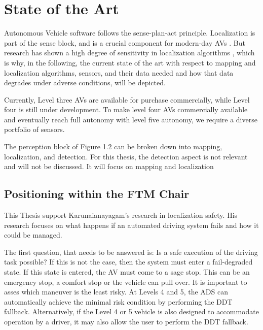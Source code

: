 


\chapter{State of the Art }%
\label{chap:StandderTechnik}%


Autonomous Vehicle software follows the sense-plan-act principle. Localization is part of the sense block, and is a crucial component for modern-day AVs \cite{goelles_fault_2020}. But research has shown a high degree of sensitivity in localization algorithms \cite{albrecht_investigation_2022}, which is why, in the following, the current state of the art with respect to mapping and localization algorithms, sensors, and their data needed and how that data degrades under adverse conditions, will be depicted. 


Currently, Level three AVs are available for purchase commercially, while Level four is still under development. To make level four AVs commercially available and eventually reach full autonomy with level five autonomy, we require a diverse portfolio of sensors. 

The perception block of Figure 1.2 can be broken down into mapping, localization, and detection. For this thesis, the detection aspect is not relevant and will not be discussed. It will focus on mapping and localization
\section{Positioning within the FTM Chair}
This Thesis support Karunaianayagam's research in localization safety. His research focuses on what happens if an automated driving system fails and how it could be managed. 

The first question, that needs to be answered is: Is a safe execution of the driving task possible? 
If this is not the case, then the system must enter a fail-degraded state. If this state is entered, the AV must come to a sage stop. This can be an emergency stop, a comfort stop or the vehicle can pull over.
It is important to asses which maneuver is the least risky. At Levels 4 and 5, the ADS can automatically achieve the minimal risk condition by performing the DDT fallback. Alternatively, if the Level 4 or 5 vehicle is also designed to accommodate operation by a driver, it may also allow the user to perform the DDT fallback. 


